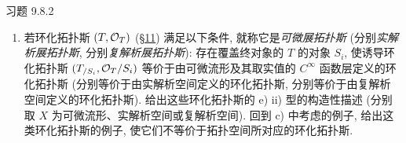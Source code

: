 \begin{enonce*}[remark]{习题 9.8.2}
\begin{enumerate}
证明 $\Top(X/G)$ 的开子拓扑斯所成的集合,
可与 $X$ 中在 $G$ 的作用下稳定的开子集所成的集合等同,
或等价地, 与商拓扑空间 $X/G$ 的开子集集合等同.
由此得出, $\Top(X/G)$ 连通,
当且仅当 $X$ 中每个既开又闭且在 $G$ 的作用下稳定的子集,
不是空集就是整个 $X$.
当 $X$ 的连通分支都是开集时,
$\Top(X/G)$ 连通, 当且仅当 $G$ 在 $X$ 的连通分支集合 $\pi_0(X)$ 上传递作用;
更一般地, $\pi_0(\Top(X/G))$
(\hyperref[IV.exer8.7]{8.7} g))
是一个本质常值的 pro-集合, 同构于商集 $\pi_0(X)/G$.

证明当 $X$ 局部连通且局部单连通,
而 $T=\Top(X,G)$ 连通,
\ie $G$ 在 $\pi_0(X)$ 上传递作用时,
在通过带算子空间 $(X',G')$ 表示 $T$ 的所有方式中
(上文给出了一些这种表示),
有一种使 $X'$ 连通且单连通,
并且这种表示在相差不唯一同构的意义下唯一.
证明选取这样的 $(X',G')$,
等于选取 $T$ 的终对象的一个“万有覆盖”,
并且 $G'$ 同构于关于此万有覆盖的群 $\pi_1(T)$
(\cf \hyperref[IV.exer2.7.5]{2.7.5}).

\noindent (提示:\pageoriginale
证明给定 $T$ 与某个 $\Top(X,G)$ 的一个等价,
等于给定 $T$ 中的一个 $G_T$-挠子 $P$;
并且若 $(X,G)$ 与 $P$ 相应,
则有典范等价 $\Top(X)\simeq T_{/P}$.)

由此给出 c) 的最后一个断言的显然证明.
将以下拓扑斯 $T$ 刻画为连通、局部连通且局部单连通的展拓扑斯:
它们等价于某个 $\Top(X,G)$,
其中 $G$ 是作用在局部连通且局部单连通拓扑空间上,
并传递地置换其连通分支的离散群;
这个刻画还要求 $T$ 的终对象 $e_T$ 的万有覆盖 $P$
满足诱导拓扑斯 $T_{/P}$ 等价于形如 $\Top(X)$ 的拓扑斯
(或如我们将滥用语言简说的,
$T_{/P}$ “是”一个拓扑空间).

给出一个局部同构于 $\mathbb{R}$ 的展拓扑斯的例子,
使它连通且单连通, 却不是拓扑空间.
(取有双原点的直线 $\mathbb{R}$ 的万有覆盖.)

\item 若环化拓扑斯 $(T,{{\mathcal O}}_T)$ (\cf \hyperref[IV.sec11]{\S 11})
满足以下条件, 就称它是\emph{可微展拓扑斯}
(分别\emph{实解析展拓扑斯}, 分别\emph{复解析展拓扑斯}):
存在覆盖终对象的 $T$ 的对象 $S_i$,
使诱导环化拓扑斯 $(T_{/S_i},{{\mathcal O}}_T/S_i)$
等价于由可微流形及其取实值的 $C^{\infty}$ 函数层定义的环化拓扑斯
(分别等价于由实解析空间定义的环化拓扑斯,
分别等价于由复解析空间定义的环化拓扑斯).
给出这些环化拓扑斯的 e) ii) 型的构造性描述
(分别取 $X$ 为可微流形、实解析空间或复解析空间).
回到 c) 中考虑的例子,
给出这类环化拓扑斯的例子,
使它们不等价于拓扑空间所对应的环化拓扑斯.
\end{enumerate}
\end{enonce*}



